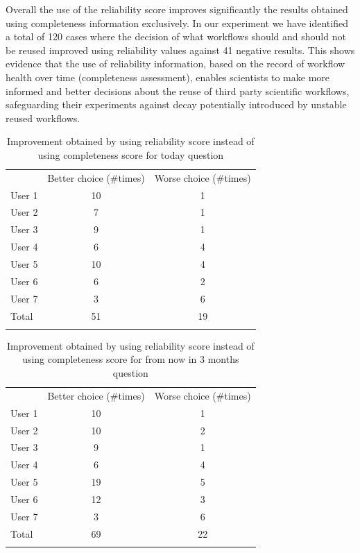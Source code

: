 \pagebreak [4]

Overall the use of the reliability score improves significantly the
results obtained using completeness information exclusively. In our
experiment we have identified a total of 120 cases where the decision of
what workflows should and should not be reused improved using
reliability values against 41 negative results. This shows evidence that
the use of reliability information, based on the record of workflow
health over time (completeness assessment), enables scientists to make
more informed and better decisions about the reuse of third party
scientific workflows, safeguarding their experiments against decay
potentially introduced by unstable reused workflows.

\begin{longtable}[c]{@{}lcc@{}}
\hline\noalign{\medskip}
& Better choice (\#times) & Worse choice (\#times)
\\\noalign{\medskip}
\hline\noalign{\medskip}
User 1 & 10 & 1
\\\noalign{\medskip}
User 2 & 7 & 1
\\\noalign{\medskip}
User 3 & 9 & 1
\\\noalign{\medskip}
User 4 & 6 & 4
\\\noalign{\medskip}
User 5 & 10 & 4
\\\noalign{\medskip}
User 6 & 6 & 2
\\\noalign{\medskip}
User 7 & 3 & 6
\\\noalign{\medskip}
Total & 51 & 19
\\\noalign{\medskip}
\hline
\caption{Improvement obtained by using reliability score 
instead of using completeness score for today question}
\end{longtable}

\begin{longtable}[c]{@{}lcc@{}}
\hline\noalign{\medskip}
& Better choice (\#times) & Worse choice (\#times)
\\\noalign{\medskip}
\hline\noalign{\medskip}
User 1 & 10 & 1
\\\noalign{\medskip}
User 2 & 10 & 2
\\\noalign{\medskip}
User 3 & 9 & 1
\\\noalign{\medskip}
User 4 & 6 & 4
\\\noalign{\medskip}
User 5 & 19 & 5
\\\noalign{\medskip}
User 6 & 12 & 3
\\\noalign{\medskip}
User 7 & 3 & 6
\\\noalign{\medskip}
Total & 69 & 22
\\\noalign{\medskip}
\hline
\caption{Improvement obtained by using reliability score instead of
using completeness score for from now in 3 months question}
\end{longtable}

